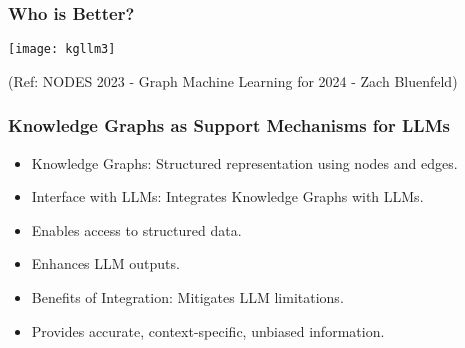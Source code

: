 \begin{frame}[fragile]\frametitle{Who is Better?}

\begin{center}
\texttt{[image: kgllm3]}
\end{center}	

{\tiny (Ref: NODES 2023 - Graph Machine Learning for 2024 - Zach Bluenfeld)}
\end{frame}






\begin{frame}[fragile]\frametitle{Knowledge Graphs as Support Mechanisms for LLMs}

\begin{itemize}
\item Knowledge Graphs: Structured representation using nodes and edges.
\item Interface with LLMs: Integrates Knowledge Graphs with LLMs.
\item Enables access to structured data.
\item Enhances LLM outputs.
\item Benefits of Integration: Mitigates LLM limitations.
\item Provides accurate, context-specific, unbiased information.
\end{itemize}	

\end{frame}





